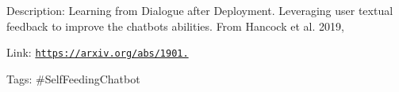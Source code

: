 Description\+: Learning from Dialogue after Deployment. Leveraging user textual feedback to improve the chatbot\textquotesingle{}s abilities. From Hancock et al. 2019,

Link\+: \href{https://arxiv.org/abs/1901.05415}{\tt https\+://arxiv.\+org/abs/1901.}

Tags\+: \#\+Self\+Feeding\+Chatbot 